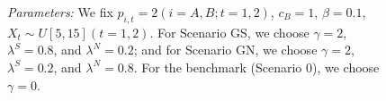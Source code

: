 \documentclass[nonblindrev,copyedit]{informs1}
\begin{document}
\begin{APPENDICES}
\begin{figure}[ht]
\begin{flushleft}
    {\footnotesize \emph{Parameters:} We fix $p_{i,t} = 2 (i = A, B; t = 1, 2)$, $c_B=1$, $\beta=0.1$, $X_t \sim U[5,15] (t = 1, 2)$. For Scenario GS, we choose $\gamma = 2$,  $\lambda^S = 0.8$, and $\lambda^N = 0.2$; and for Scenario GN, we choose $\gamma = 2$, $\lambda^S = 0.2$, and $\lambda^N = 0.8$. For the benchmark (Scenario $0$), we choose $\gamma = 0$.}
\end{flushleft}
\end{figure}

\end{APPENDICES}
\end{document}
